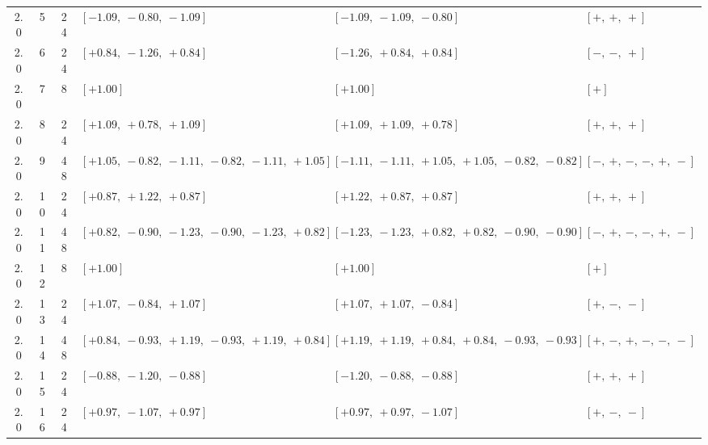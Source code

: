 \begin{landscape}
\begin{longtable}{@{}ccc >{\raggedright\arraybackslash}p{6.1cm} >{\raggedright\arraybackslash}p{6.1cm} >{\raggedright\arraybackslash}p{4.2cm}@{}}
2.0 & 5 & 24 & \([-1.09,\allowbreak\ -0.80,\allowbreak\ -1.09]\) & \([-1.09,\allowbreak\ -1.09,\allowbreak\ -0.80]\) & \([+,\allowbreak\ +,\allowbreak\ +]\) \\
2.0 & 6 & 24 & \([+0.84,\allowbreak\ -1.26,\allowbreak\ +0.84]\) & \([-1.26,\allowbreak\ +0.84,\allowbreak\ +0.84]\) & \([-,\allowbreak\ -,\allowbreak\ +]\) \\
2.0 & 7 & 8 & \([+1.00]\) & \([+1.00]\) & \([+]\) \\
2.0 & 8 & 24 & \([+1.09,\allowbreak\ +0.78,\allowbreak\ +1.09]\) & \([+1.09,\allowbreak\ +1.09,\allowbreak\ +0.78]\) & \([+,\allowbreak\ +,\allowbreak\ +]\) \\
2.0 & 9 & 48 & \([+1.05,\allowbreak\ -0.82,\allowbreak\ -1.11,\allowbreak\ -0.82,\allowbreak\ -1.11,\allowbreak\ +1.05]\) & \([-1.11,\allowbreak\ -1.11,\allowbreak\ +1.05,\allowbreak\ +1.05,\allowbreak\ -0.82,\allowbreak\ -0.82]\) & \([-,\allowbreak\ +,\allowbreak\ -,\allowbreak\ -,\allowbreak\ +,\allowbreak\ -]\) \\
2.0 & 10 & 24 & \([+0.87,\allowbreak\ +1.22,\allowbreak\ +0.87]\) & \([+1.22,\allowbreak\ +0.87,\allowbreak\ +0.87]\) & \([+,\allowbreak\ +,\allowbreak\ +]\) \\
2.0 & 11 & 48 & \([+0.82,\allowbreak\ -0.90,\allowbreak\ -1.23,\allowbreak\ -0.90,\allowbreak\ -1.23,\allowbreak\ +0.82]\) & \([-1.23,\allowbreak\ -1.23,\allowbreak\ +0.82,\allowbreak\ +0.82,\allowbreak\ -0.90,\allowbreak\ -0.90]\) & \([-,\allowbreak\ +,\allowbreak\ -,\allowbreak\ -,\allowbreak\ +,\allowbreak\ -]\) \\
2.0 & 12 & 8 & \([+1.00]\) & \([+1.00]\) & \([+]\) \\
2.0 & 13 & 24 & \([+1.07,\allowbreak\ -0.84,\allowbreak\ +1.07]\) & \([+1.07,\allowbreak\ +1.07,\allowbreak\ -0.84]\) & \([+,\allowbreak\ -,\allowbreak\ -]\) \\
2.0 & 14 & 48 & \([+0.84,\allowbreak\ -0.93,\allowbreak\ +1.19,\allowbreak\ -0.93,\allowbreak\ +1.19,\allowbreak\ +0.84]\) & \([+1.19,\allowbreak\ +1.19,\allowbreak\ +0.84,\allowbreak\ +0.84,\allowbreak\ -0.93,\allowbreak\ -0.93]\) & \([+,\allowbreak\ -,\allowbreak\ +,\allowbreak\ -,\allowbreak\ -,\allowbreak\ -]\) \\
2.0 & 15 & 24 & \([-0.88,\allowbreak\ -1.20,\allowbreak\ -0.88]\) & \([-1.20,\allowbreak\ -0.88,\allowbreak\ -0.88]\) & \([+,\allowbreak\ +,\allowbreak\ +]\) \\
2.0 & 16 & 24 & \([+0.97,\allowbreak\ -1.07,\allowbreak\ +0.97]\) & \([+0.97,\allowbreak\ +0.97,\allowbreak\ -1.07]\) & \([+,\allowbreak\ -,\allowbreak\ -]\) \\

\end{longtable}
\end{landscape}
